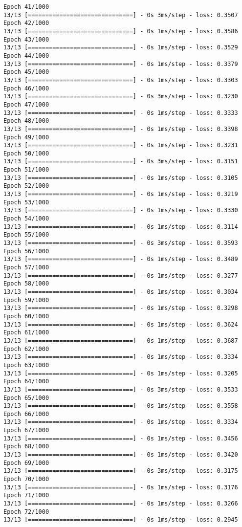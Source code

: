 \documentclass[11pt]{article}
\begin{document}
\begin{Verbatim}[commandchars=\\\{\}]
Epoch 41/1000
13/13 [==============================] - 0s 3ms/step - loss: 0.3507
Epoch 42/1000
13/13 [==============================] - 0s 1ms/step - loss: 0.3586
Epoch 43/1000
13/13 [==============================] - 0s 1ms/step - loss: 0.3529
Epoch 44/1000
13/13 [==============================] - 0s 1ms/step - loss: 0.3379
Epoch 45/1000
13/13 [==============================] - 0s 1ms/step - loss: 0.3303
Epoch 46/1000
13/13 [==============================] - 0s 3ms/step - loss: 0.3230
Epoch 47/1000
13/13 [==============================] - 0s 1ms/step - loss: 0.3333
Epoch 48/1000
13/13 [==============================] - 0s 1ms/step - loss: 0.3398
Epoch 49/1000
13/13 [==============================] - 0s 1ms/step - loss: 0.3231
Epoch 50/1000
13/13 [==============================] - 0s 3ms/step - loss: 0.3151
Epoch 51/1000
13/13 [==============================] - 0s 1ms/step - loss: 0.3105
Epoch 52/1000
13/13 [==============================] - 0s 1ms/step - loss: 0.3219
Epoch 53/1000
13/13 [==============================] - 0s 1ms/step - loss: 0.3330
Epoch 54/1000
13/13 [==============================] - 0s 1ms/step - loss: 0.3114
Epoch 55/1000
13/13 [==============================] - 0s 3ms/step - loss: 0.3593
Epoch 56/1000
13/13 [==============================] - 0s 1ms/step - loss: 0.3489
Epoch 57/1000
13/13 [==============================] - 0s 1ms/step - loss: 0.3277
Epoch 58/1000
13/13 [==============================] - 0s 1ms/step - loss: 0.3034
Epoch 59/1000
13/13 [==============================] - 0s 1ms/step - loss: 0.3298
Epoch 60/1000
13/13 [==============================] - 0s 1ms/step - loss: 0.3624
Epoch 61/1000
13/13 [==============================] - 0s 1ms/step - loss: 0.3687
Epoch 62/1000
13/13 [==============================] - 0s 1ms/step - loss: 0.3334
Epoch 63/1000
13/13 [==============================] - 0s 1ms/step - loss: 0.3205
Epoch 64/1000
13/13 [==============================] - 0s 3ms/step - loss: 0.3533
Epoch 65/1000
13/13 [==============================] - 0s 1ms/step - loss: 0.3558
Epoch 66/1000
13/13 [==============================] - 0s 1ms/step - loss: 0.3334
Epoch 67/1000
13/13 [==============================] - 0s 1ms/step - loss: 0.3456
Epoch 68/1000
13/13 [==============================] - 0s 1ms/step - loss: 0.3420
Epoch 69/1000
13/13 [==============================] - 0s 3ms/step - loss: 0.3175
Epoch 70/1000
13/13 [==============================] - 0s 1ms/step - loss: 0.3176
Epoch 71/1000
13/13 [==============================] - 0s 1ms/step - loss: 0.3266
Epoch 72/1000
13/13 [==============================] - 0s 1ms/step - loss: 0.2945

\end{Verbatim}
\end{document}
